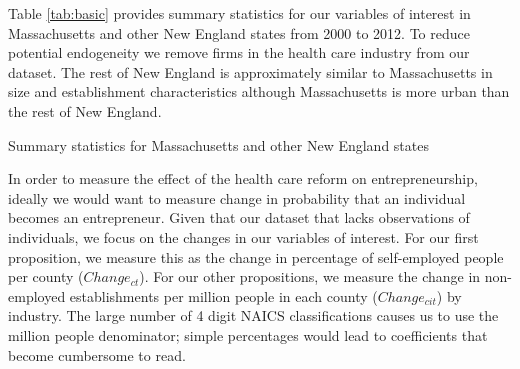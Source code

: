 \documentclass[12pt]{article}
\begin{document}
Table \ref{tab:basic} provides summary statistics for our variables of interest in Massachusetts and other New England states from 2000 to 2012. To reduce potential endogeneity we remove firms in the health care industry from our dataset. The rest of New England is approximately similar to Massachusetts in size and establishment characteristics although Massachusetts is more urban than the rest of New England. 

\begin{table}[H]
	\centering
	\caption{Summary statistics for Massachusetts and other New England states}
	
	\label{tab:basic}
\end{table}

In order to measure the effect of the health care reform on entrepreneurship, ideally we would want to measure change in probability that an individual becomes an entrepreneur. Given that our dataset that lacks observations of individuals, we focus on the changes in our variables of interest. For our first proposition, we measure this as the change in percentage of self-employed people per county ($Change_{ct}$). For our other propositions, we measure the change in non-employed establishments per million people in each county ($Change_{cit}$) by industry. The large number of 4 digit NAICS classifications causes us to use the million people denominator; simple percentages would lead to coefficients that become cumbersome to read. 
\end{document}
